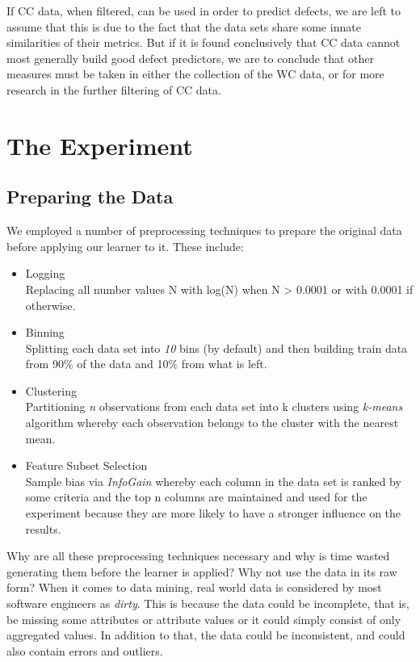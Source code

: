 \documentclass{sig-alternate}
\begin{document}
If CC data, when filtered, can be used in order to predict defects, we are left to assume that this is due to the fact that the data sets share some innate similarities of their metrics. But if it is found conclusively that CC data cannot most generally build good defect predictors, we are to conclude that other measures must be taken in either the collection of the WC data, or for more research in the further filtering of CC data.



\section{The Experiment}


\subsection{Preparing the Data}
We employed a number of preprocessing techniques to prepare the original data before applying our learner to it. These include:

\begin{itemize}
\item{Logging}
\\Replacing all number values N with log(N) when N > 0.0001 or with 0.0001 if otherwise.
\item{Binning}
\\Splitting each data set into {\em 10} bins (by default) and then building train data from 90\% of the data and 10\% from what is left.
\item{Clustering}
\\Partitioning {\em n} observations from each data set into k clusters using {\em k-means} algorithm whereby each observation belongs to the cluster with the nearest mean.
\item{Feature Subset Selection}
\\Sample bias via {\em InfoGain} whereby each column in the data set is ranked by some criteria and the top n columns are maintained and used for the experiment because they are more likely to have a stronger influence on the results.
\end{itemize}
Why are all these preprocessing techniques necessary and why is time wasted generating them before the learner is applied? Why not use the data in its raw form? When it comes to data mining, real world data is considered by most software engineers as {\em dirty}. This is because the data could be incomplete, that is, be missing some attributes or attribute values or it could simply consist of only aggregated values. In addition to that, the data could be inconsistent, and could also contain errors and outliers.
\end{document}
